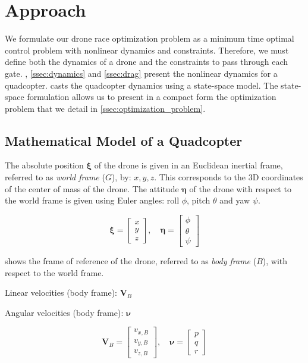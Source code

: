 
\section{Approach}
\label{sec:mathematical_formulation}

We formulate our drone race optimization problem as a minimum time optimal control problem with nonlinear dynamics and constraints.
Therefore, we must define both the dynamics of a drone and the constraints to pass through each gate.
, \ref{ssec:dynamics} and \ref{ssec:drag} present the nonlinear dynamics for a quadcopter.
 casts the quadcopter dynamics using a state-space model.
The state-space formulation allows us to present in a compact form the optimization problem that we detail in \cref{ssec:optimization_problem}.

\subsection{Mathematical Model of a Quadcopter}
\label{ssec:model}

The absolute position $\boldsymbol{\xi}$ of the drone is given in an Euclidean inertial frame, referred to as \textit{world frame} ($G$), by: $x, y, z$.
This corresponds to the 3D coordinates of the center of mass of the drone.
The attitude $\boldsymbol{\eta}$ of the drone with respect to the world frame is given using Euler angles: roll $\phi$, pitch $\theta$ and yaw $\psi$.

$$\boldsymbol{\xi}=\left[ \begin{array}{l}{x} \\ {y} \\ {z}\end{array}\right],
 \quad \boldsymbol{\eta}=\left[ \begin{array}{l}{\phi} \\ {\theta} \\ {\psi}\end{array}\right]$$

 shows the frame of reference of the drone, referred to as \textit{body frame} ($B$), with respect to the world frame.

Linear velocities (body frame): $\boldsymbol{V}_{B}$

Angular velocities (body frame): $\boldsymbol{\nu}$

$$\boldsymbol{V}_{B}=\left[ \begin{array}{c}{v_{x, B}} \\ {v_{y, B}} \\ {v_{z, B}}\end{array}\right], \quad \boldsymbol{\nu}=\left[ \begin{array}{l}{p} \\ {q} \\ {r}\end{array}\right]$$

